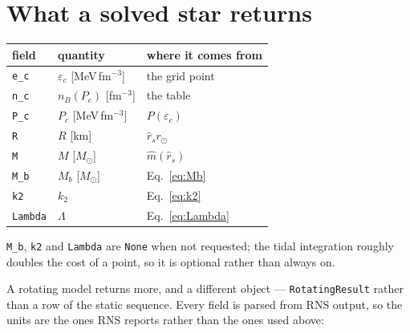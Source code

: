 \documentclass[aps,prc,onecolumn,superscriptaddress,nofootinbib,10pt]{revtex4-2}
\newcommand{\nB}{n_B}
\newcommand{\Msun}{M_\odot}
\newcommand{\rsun}{r_\odot}
\begin{document}
\section{What a solved star returns}
\label{sec:returns}

\begin{center}
\begin{tabular}{lll}
\toprule
field & quantity & where it comes from \\
\midrule
\texttt{e\_c}   & $\varepsilon_c$ [MeV\,fm$^{-3}$] & the grid point \\
\texttt{n\_c}   & $\nB(P_c)$ [fm$^{-3}$]           & the table \\
\texttt{P\_c}   & $P_c$ [MeV\,fm$^{-3}$]           & $P(\varepsilon_c)$ \\
\texttt{R}      & $R$ [km]                          & $\hat r_s \rsun$ \\
\texttt{M}      & $M$ [$\Msun$]                     & $\hat m(\hat r_s)$ \\
\texttt{M\_b}   & $M_b$ [$\Msun$]                   & Eq.~\eqref{eq:Mb} \\
\texttt{k2}     & $k_2$                             & Eq.~\eqref{eq:k2} \\
\texttt{Lambda} & $\Lambda$                         & Eq.~\eqref{eq:Lambda} \\
\bottomrule
\end{tabular}
\end{center}

\noindent
\texttt{M\_b}, \texttt{k2} and \texttt{Lambda} are \texttt{None} when not
requested; the tidal integration roughly doubles the cost of a point, so it is
optional rather than always on.

A rotating model returns more, and a different object --- \texttt{RotatingResult}
rather than a row of the static sequence. Every field is parsed from RNS output,
so the units are the ones RNS reports rather than the ones used above:
\end{document}
